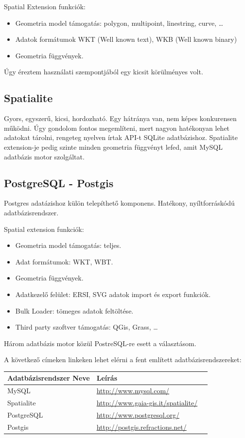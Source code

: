 	Spatial Extension funkciók:
	\begin{itemize}
		\item Geometria model támogatás: polygon, multipoint, linestring, curve, \ldots
		\item Adatok formátumok WKT (Well known text), WKB (Well known binary)
		\item Geometria függvények.
	\end{itemize}
	Úgy éreztem használati szempontjából egy kicsit körülményes volt.

	\subsection{Spatialite} %
	\label{sub:spatialite}
	Gyors, egyszerű, kicsi, hordozható. Egy hátránya van, nem képes konkurensen működni. Úgy gondolom fontos megemlíteni, mert
	nagyon hatékonyan lehet adatokat tárolni, rengeteg nyelven írtak API-t SQLite adatbázishoz. Spatialite extension-je pedig szinte minden
	geometria függvényt lefed, amit MySQL adatbázis motor szolgáltat.
	
	\subsection{PostgreSQL - Postgis} %
	\label{sub:postgresql}
	Postgres adatázishoz külön telepíthető komponens. Hatékony, nyíltforráskódú adatbázisrendszer.
	
	Spatial extension funkciók:
	\begin{itemize}
		\item Geometria model támogatás: teljes.
		\item Adat formátumok: WKT, WBT.
		\item Geometria függvények.
		\item Adatkezelő felület: ERSI, SVG adatok import és export funkciók.
		\item Bulk Loader: tömeges adatok feltöltése.
		\item Third party szoftver támogatás: QGis, Grass, \ldots
	\end{itemize}
	Három adatbázis motor közül PostreSQL-re esett a választásom.
	
	A következő címeken linkeken lehet elérni a fent említett adatbázisrendszereket:
	\begin{center}
	    \begin{tabular}{ | l | l | p{5cm} |}
		\hline
	    \hline
	    Adatbázisrendszer Neve & Leírás \\ \hline
	    MySQL & \url{http://www.mysql.com/} \\ \hline
 		Spatialite & \url{http://www.gaia-gis.it/spatialite/} \\ \hline
 		PostgreSQL & \url{http://www.postgresql.org/} \\ \hline
	    Postgis & \url{http://postgis.refractions.net/} \\ \hline
	    \hline
	    \end{tabular}
	\end{center}

